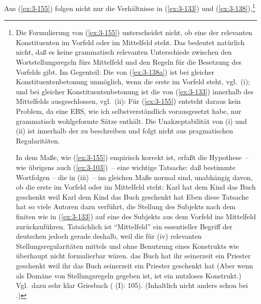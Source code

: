 \documentclass[output=paper]{langsci/langscibook}
\begin{document}
Aus (\ref{ex:3-155}) folgen nicht nur die Verhältnisse in (\ref{ex:3-133}) und (\ref{ex:3-138}),\footnote{\label{fn:3-27}%
	Die Formulierung von (\ref{ex:3-155}) unterscheidet nicht, ob eine der relevanten Konstituenten im Vorfeld oder im Mittelfeld steht. Das bedeutet natürlich nicht, daß es keine grammatisch relevanten Unterschiede zwischen den Wortstellungsregeln fürs Mittelfeld und den Regeln für die Besetzung des Vorfelds gibt. Im Gegenteil: Die  von (\ref{ex:3-138a}) ist bei gleicher Konstituentenbetonung unmöglich, wenn die erste  im Vorfeld steht, vgl.\ (i); und bei gleicher Konstituentenbetonung ist die  von (\ref{ex:3-133}) innerhalb des Mittelfelds ausgeschlossen, vgl.\ (ii):
  \zmid
  \eal
  \label{ex:3-fn27ii}
  \zl
  Für (\ref{ex:3-155}) entsteht daraus kein Problem, da eine EBS, wie ich
  selbstverständlich vorausgesetzt habe, nur grammatisch wohlgeformte
  Sätze enthält. Die Unakzeptabilität von (i) und (ii) ist innerhalb
  der  zu beschreiben und folgt nicht aus pragmatischen
  Regularitäten.

  In dem Maße, wie (\ref{ex:3-155}) empirisch korrekt ist, erfaßt die Hypothese~--
  wie übrigens auch (\ref{ex:3-103})~-- eine wichtige Tatsache: daß bestimmte
  Wortfolgen -- \zb die in (iii)~-- im gleichen Maße normal sind,
  unabhängig davon, ob die erste  im Vorfeld oder im
  Mittelfeld steht:
  \eal
  \label{ex:3-fn27iii}
  \ex
  \label{ex:3-fn27iiia}
  Karl hat dem Kind das Buch geschenkt
  \ex
  \label{ex:3-fn27iiib}
  weil Karl dem Kind das Buch geschenkt hat
  \zl
  Eben diese Tatsache hat so viele Autoren dazu verführt, die Stellung
  des Subjekts nach dem finiten  wie in (\ref{ex:3-133}) auf eine
   des Subjekts aus dem Vorfeld ins Mittelfeld
  zurückzuführen. Tatsächlich ist "`Mittelfeld"' ein essentieller Begriff
  der deutschen  jedoch gerade deshalb, weil die \zb für
  (iv) relevanten Stellungsregularitäten mittels
   und ohne Benutzung eines Konstrukts wie
   überhaupt nicht formulierbar wären.
  \eal
  \label{ex:3-fn27iv}
  \ex
  \label{ex:3-fn27iva}
  das Buch hat ihr seinerzeit ein Priester geschenkt
  \ex
  \label{ex:3-fn27ivb}
  weil ihr das Buch seinerzeit ein Priester geschenkt hat
  \zl
  (Aber wenn  als Domäne von Stellungsregeln gegeben ist,
  ist  ein nutzloses Konstrukt.) Vgl.\ dazu sehr
  klar Griesbach (\citeyear{Griesbach1960a} (I): 105). (Inhaltlich nicht anders schon bei
  \citet[182f, 189, 196]{Erdmann1886}.)%
}
\end{document}
